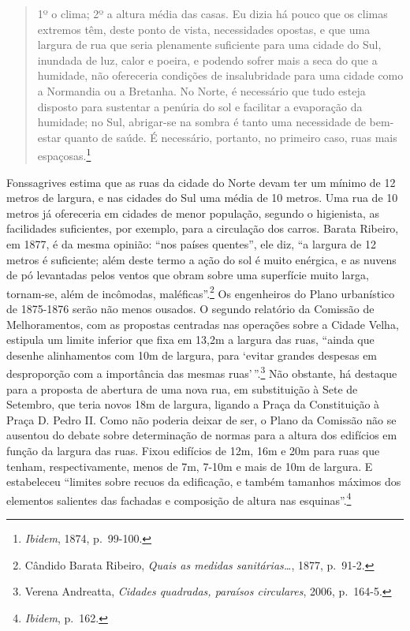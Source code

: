 \begin{quote}
1º o clima; 2º a altura média das casas. Eu dizia há pouco que os climas
extremos têm, deste ponto de vista, necessidades opostas, e que uma
largura de rua que seria plenamente suficiente para uma cidade do Sul,
inundada de luz, calor e poeira, e podendo sofrer mais a seca do que a
humidade, não ofereceria condições de insalubridade para uma cidade como
a Normandia ou a Bretanha. No Norte, é necessário que tudo esteja
disposto para sustentar a penúria do sol e facilitar a evaporação da
humidade; no Sul, abrigar-se na sombra é tanto uma necessidade de
bem-estar quanto de saúde. É necessário, portanto, no primeiro caso,
ruas mais espaçosas.\footnote{\textit{Ibidem}, 1874, p.~99-100.}
\end{quote}

Fonssagrives estima que as ruas da cidade do Norte devam ter um mínimo
de 12 metros de largura, e nas cidades do Sul uma média de 10 metros.
Uma rua de 10 metros já ofereceria em cidades de menor população,
segundo o higienista, as facilidades suficientes, por exemplo, para a
circulação dos carros. Barata Ribeiro, em 1877, é da mesma opinião:
``nos países quentes'', ele diz, ``a largura de 12 metros é suficiente;
além deste termo a ação do sol é muito enérgica, e as nuvens de pó
levantadas pelos ventos que obram sobre uma superfície muito larga,
tornam-se, além de incômodas, maléficas''.\footnote{Cândido Barata
  Ribeiro, \textit{Quais as medidas sanitárias\ldots{}}, 1877, p.~91-2.}
Os engenheiros do Plano urbanístico de 1875-1876 serão não menos
ousados. O segundo relatório da Comissão de Melhoramentos, com as
propostas centradas nas operações sobre a Cidade Velha, estipula um
limite inferior que fixa em 13,2m a largura das ruas, ``ainda que
desenhe alinhamentos com 10m de largura, para `evitar grandes despesas
em desproporção com a importância das mesmas ruas'\,''.\footnote{Verena
  Andreatta, \textit{Cidades quadradas, paraísos circulares}, 2006,
  p.~164-5.} Não obstante, há destaque para a proposta de abertura de
uma nova rua, em substituição à Sete de Setembro, que teria novos 18m de
largura, ligando a Praça da Constituição à Praça D. Pedro II. Como não
poderia deixar de ser, o Plano da Comissão não se ausentou do debate
sobre determinação de normas para a altura dos edifícios em função da
largura das ruas. Fixou edifícios de 12m, 16m e 20m para ruas que
tenham, respectivamente, menos de 7m, 7-10m e mais de 10m de largura. E
estabeleceu ``limites sobre recuos da edificação, e também tamanhos
máximos dos elementos salientes das fachadas e composição de altura nas
esquinas''.\footnote{\textit{Ibidem}, p.~162.}


